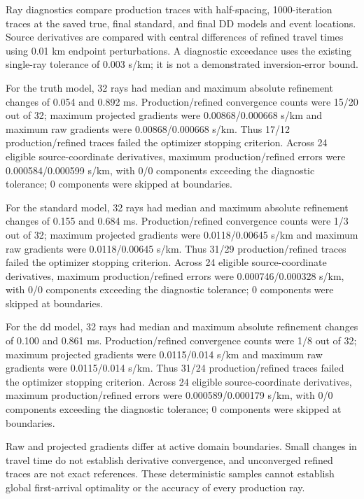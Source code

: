 Ray diagnostics compare production traces with half-spacing, 1000-iteration traces at the saved true, final standard, and final DD models and event locations. Source derivatives are compared with central differences of refined travel times using 0.01 km endpoint perturbations. A diagnostic exceedance uses the existing single-ray tolerance of 0.003 s/km; it is not a demonstrated inversion-error bound.

For the truth model, 32 rays had median and maximum absolute refinement changes of 0.054 and 0.892 ms. Production/refined convergence counts were 15/20 out of 32; maximum projected gradients were 0.00868/0.000668 s/km and maximum raw gradients were 0.00868/0.000668 s/km. Thus 17/12 production/refined traces failed the optimizer stopping criterion. Across 24 eligible source-coordinate derivatives, maximum production/refined errors were 0.000584/0.000599 s/km, with 0/0 components exceeding the diagnostic tolerance; 0 components were skipped at boundaries.

For the standard model, 32 rays had median and maximum absolute refinement changes of 0.155 and 0.684 ms. Production/refined convergence counts were 1/3 out of 32; maximum projected gradients were 0.0118/0.00645 s/km and maximum raw gradients were 0.0118/0.00645 s/km. Thus 31/29 production/refined traces failed the optimizer stopping criterion. Across 24 eligible source-coordinate derivatives, maximum production/refined errors were 0.000746/0.000328 s/km, with 0/0 components exceeding the diagnostic tolerance; 0 components were skipped at boundaries.

For the dd model, 32 rays had median and maximum absolute refinement changes of 0.100 and 0.861 ms. Production/refined convergence counts were 1/8 out of 32; maximum projected gradients were 0.0115/0.014 s/km and maximum raw gradients were 0.0115/0.014 s/km. Thus 31/24 production/refined traces failed the optimizer stopping criterion. Across 24 eligible source-coordinate derivatives, maximum production/refined errors were 0.000589/0.000179 s/km, with 0/0 components exceeding the diagnostic tolerance; 0 components were skipped at boundaries.

Raw and projected gradients differ at active domain boundaries. Small changes in travel time do not establish derivative convergence, and unconverged refined traces are not exact references. These deterministic samples cannot establish global first-arrival optimality or the accuracy of every production ray.
